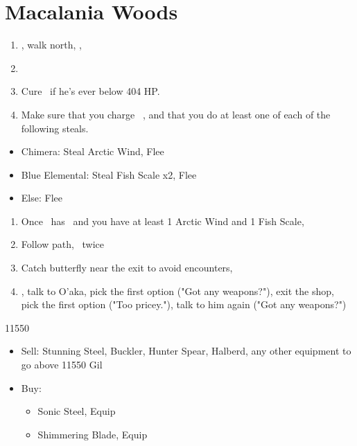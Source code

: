 \chapter{Macalania Woods}

\begin{enumerate}
    \item \sd, walk north, \sd, \save
    \item \formation{\tidus}{\rikku}{\auron}
    \item Cure \tidus\ if he's ever below 404 HP.
    \item Make sure that you charge \rikku\ \od, and that you do at least one of each of the following steals.
\end{enumerate}
\begin{encounters}
    \begin{itemize}
        \item Chimera: Steal Arctic Wind, Flee
        \item Blue Elemental: Steal Fish Scale x2, Flee
        \item Else: Flee
    \end{itemize}
\end{encounters}
\begin{enumerate}[resume]
    \item Once \rikku\ has \od\ and you have at least 1 Arctic Wind and 1 Fish Scale, \formation{\tidus}{\kimahri}{\auron}
    \item Follow path, \sd\ twice
    \item Catch butterfly near the exit to avoid encounters, \formation{\tidus}{\kimahri}{\auron}
    \item \save, talk to O'aka, pick the first option ("Got any weapons?"), exit the shop, pick the first option ("Too pricey."), talk to him again ("Got any weapons?")
\end{enumerate}
\begin{shop}{11550}
    \begin{itemize}
        \item Sell: Stunning Steel, Buckler, Hunter Spear, Halberd, any other equipment to go above 11550 Gil
        \item Buy:
        \begin{itemize}
            \item Sonic Steel, Equip
            \item Shimmering Blade, Equip
        \end{itemize}
    \end{itemize}
\end{shop}
